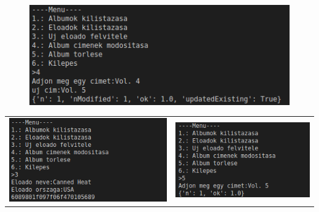 \documentclass[a4paper, 12pt]{article}
\begin{document}
\begin{figure}[!hb]
	\centering
	\includegraphics[scale = 0.7]{images/3_out4.png}
	\label{fig:3_out4}
\end{figure}	

\bigskip

\begin{tabular}{ c c }
\includegraphics[scale = 0.7]{images/3_out3.png} & \includegraphics[scale = 0.7]{images/3_out5.png}
\end{tabular}
\end{document}
